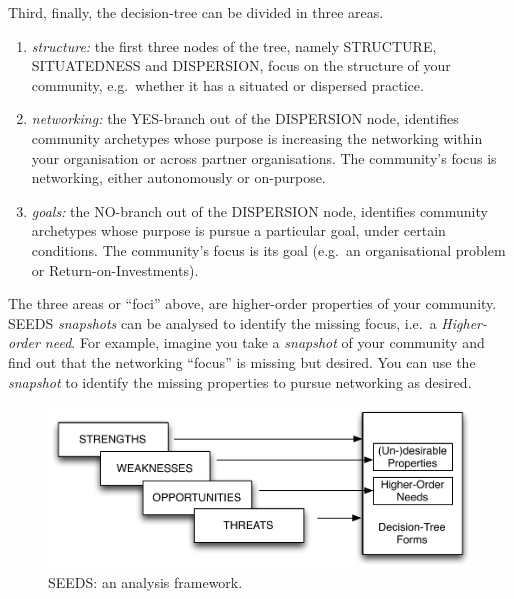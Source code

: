 Third, finally, the decision-tree can be divided in three areas. 
\begin{enumerate} 
\item \emph{structure:} the first three nodes of the tree, namely STRUCTURE, SITUATEDNESS and DISPERSION, focus on the structure of your community, e.g.~whether it has a situated or dispersed practice.
\item \emph{networking:} the YES-branch out of the DISPERSION node, identifies community archetypes whose purpose is increasing the networking within your organisation or across partner organisations. The community's focus is networking, either autonomously or on-purpose.
\item \emph{goals:} the NO-branch out of the DISPERSION node, identifies community archetypes whose purpose is pursue a particular goal, under certain conditions. The community's focus is its goal (e.g.~an organisational problem or Return-on-Investments).
\end{enumerate}

The three areas or ``foci'' above, are higher-order properties of your community. SEEDS \emph{\emph{snapshots}} can be analysed to identify the missing focus, i.e.~a \emph{Higher-order need}. For example, imagine you take a \emph{snapshot} of your community and find out that the networking ``focus'' is missing but desired. You can use the \emph{snapshot} to identify the missing properties to pursue networking as desired.

\begin{figure}[h!]
    \includegraphics[width=5.4in]{fw.pdf}    %
\caption{\footnotesize SEEDS: an analysis framework.}\label{fwpic}
\end{figure}


